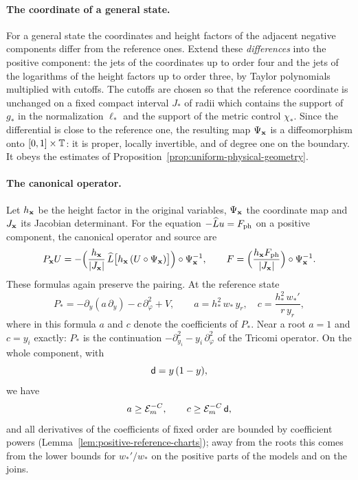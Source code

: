 \paragraph{The coordinate of a general state.}
For a general state the coordinates and height factors of the
adjacent negative components differ from the reference ones. Extend
these \emph{differences} into the positive component: the jets of the
coordinates up to order four and the jets of the logarithms of the
height factors up to order three, by Taylor polynomials multiplied
with cutoffs. The cutoffs are chosen so that the reference
coordinate is unchanged on a fixed compact interval $J_*$ of radii
which contains the support of $g_*$ in the normalization $\ell_*$ and
the support of the metric control $\chi_*$. Since the differential is
close to the reference one, the resulting map $\Psi_{\mathbf x}$ is a
diffeomorphism onto $[0,1]\times\mathbb T$: it is proper, locally invertible,
and of degree one on the boundary. It obeys the estimates of
Proposition~\ref{prop:uniform-physical-geometry}.

\paragraph{The canonical operator.}
Let $h_{\mathbf x}$ be the height factor in the original variables,
$\Psi_{\mathbf x}$ the coordinate map and $J_{\mathbf x}$ its Jacobian
determinant. For the equation $-\widehat Lu=F_{\rm ph}$ on a positive
component, the canonical operator and source are
\begin{equation}\label{eq:pp-fixed-canonical-source}
 P_{\mathbf x}U
 =-\Bigl(\frac{h_{\mathbf x}}{|J_{\mathbf x}|}\,
       \widehat L\bigl[h_{\mathbf x}\,(U\circ\Psi_{\mathbf x})\bigr]\Bigr)
             \circ\Psi_{\mathbf x}^{-1},\qquad
 F=\Bigl(\frac{h_{\mathbf x}F_{\rm ph}}{|J_{\mathbf x}|}\Bigr)
             \circ\Psi_{\mathbf x}^{-1} .
\end{equation}
These formulas again preserve the pairing. At the reference state
\[
 P_*=-\partial_y(a\,\partial_y)-c\,\partial_\varphi^2+V,
 \qquad a=h_*^2\,w_*\,y_r,\quad c=\frac{h_*^2\,w_*'}{r\,y_r},
\]
where in this formula $a$ and $c$ denote the coefficients of $P_*$.
Near a root $a=1$ and $c=y_i$ exactly: $P_*$ is the continuation
$-\partial_{y_i}^2-y_i\,\partial_\varphi^2$ of the Tricomi operator.
On the whole component, with
\[
 \mathsf d=y\,(1-y),
\]
we have
\begin{equation}\label{eq:positive-coefficients}
 a\ge\mathcal E_m^{-C},\qquad c\ge\mathcal E_m^{-C}\,\mathsf d ,
\end{equation}
and all derivatives of the coefficients of fixed order are bounded by
coefficient powers
(Lemma~\ref{lem:positive-reference-charts}); away from the roots
this comes from the lower bounds for $w_*'/w_*$ on the positive parts
of the models and on the joins.

